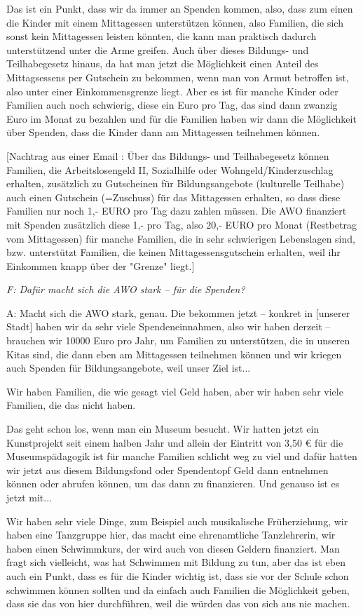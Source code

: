 \begin{linenumbers*}
Das ist ein Punkt, dass wir da immer an Spenden kommen, also, dass zum einen die Kinder mit einem Mittagessen unterstützen können, also Familien, die sich sonst kein Mittagessen leisten könnten, die kann man praktisch dadurch unterstützend unter die Arme greifen. Auch über dieses Bildungs- und Teilhabegesetz hinaus, da hat man jetzt die Möglichkeit einen Anteil des Mittagsessens per Gutschein zu bekommen, wenn man von Armut betroffen ist, also unter einer Einkommensgrenze liegt. Aber es ist für manche Kinder oder Familien auch noch schwierig, diese ein Euro pro Tag, das sind dann zwanzig Euro im Monat zu bezahlen und für die Familien haben wir dann die Möglichkeit über Spenden, dass die Kinder dann am Mittagessen teilnehmen können. 

[Nachtrag aus einer Email : Über das Bildungs- und Teilhabegesetz können Familien, die Arbeitslosengeld II, Sozialhilfe oder Wohngeld/Kinderzuschlag erhalten, zusätzlich zu Gutscheinen für Bildungsangebote (kulturelle Teilhabe) auch einen Gutschein (=Zuschuss) für das Mittagessen erhalten, so dass diese Familien nur noch 1,- EURO pro Tag dazu zahlen müssen. 
Die AWO finanziert mit Spenden zusätzlich diese 1,- pro Tag, also 20,- EURO pro Monat (Restbetrag vom Mittagessen) für manche Familien, die in sehr schwierigen Lebenslagen sind, bzw. unterstützt Familien, die keinen Mittagessensgutschein erhalten, weil ihr Einkommen knapp über der "Grenze" liegt.]

\emph{F: Dafür macht sich die AWO stark -- für die Spenden?}

A: Macht sich die AWO stark, genau. Die bekommen jetzt -- konkret in [unserer Stadt] haben wir da sehr viele Spendeneinnahmen, also wir haben derzeit -- brauchen wir 10000 Euro pro Jahr, um Familien zu unterstützen, die in unseren Kitas sind, die dann eben am Mittagessen teilnehmen können und wir kriegen auch Spenden für Bildungsangebote, weil unser Ziel ist... 

Wir haben Familien, die wie gesagt viel Geld haben, aber wir haben sehr viele Familien, die das nicht haben. 

Das geht schon los, wenn man ein Museum besucht. Wir hatten jetzt ein Kunstprojekt seit einem halben Jahr und allein der Eintritt von 3,50 € für die Museumspädagogik ist für manche Familien schlicht weg zu viel und dafür hatten wir jetzt aus diesem Bildungsfond oder Spendentopf Geld dann entnehmen können oder abrufen können, um das dann zu finanzieren. Und genauso ist es jetzt mit... 

Wir haben sehr viele Dinge, zum Beispiel auch musikalische Früherziehung, wir haben eine Tanzgruppe hier, das macht eine ehrenamtliche Tanzlehrerin, wir haben einen Schwimmkurs, der wird auch von diesen Geldern finanziert. Man fragt sich vielleicht, was hat Schwimmen mit Bildung zu tun, aber das ist eben auch ein Punkt, dass es für die Kinder wichtig ist, dass sie vor der Schule schon schwimmen können sollten und da einfach auch Familien die Möglichkeit geben, dass sie das von hier durchführen, weil die würden das von sich aus nie machen. 


\end{linenumbers*}
